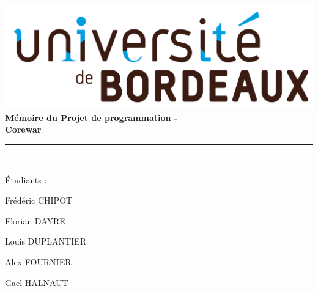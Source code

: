 \begin{titlepage}
 \begin{sffamily}
  \begin{center}
            \includegraphics[scale=0.04]{image/ubx-logo.png}
            \\[2cm]
        
    
    {\huge \bfseries Mémoire du Projet de programmation -\\ Corewar\\[0.5cm] }

    \rule{\linewidth}{.5pt}
    \\[2cm]

    \begin{minipage}{0.4\textwidth}
      \begin{flushleft} \large
        \author{}Étudiants : \item  Frédéric CHIPOT  \item Florian DAYRE \item Louis DUPLANTIER\\ \item  Alex FOURNIER\\ \item Gael HALNAUT
            
      \end{flushleft}
    \end{minipage}
    \begin{minipage}{0.4\textwidth}
      \begin{flushright} \large
        \emph{}\\  \textsc{}
      \end{flushright}
    \end{minipage}

    \vfill

    {\large }

  \end{center}
  \end{sffamily}
  
\end{titlepage}